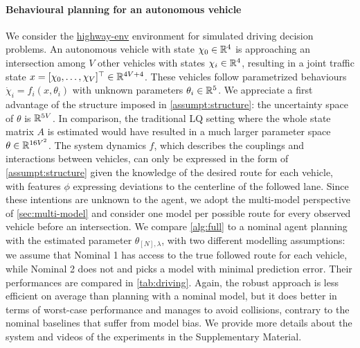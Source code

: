 \paragraph{Behavioural planning for an autonomous vehicle}
We consider the \href{https://github.com/eleurent/highway-env}{highway-env} environment \citep{highway-env} for simulated driving decision problems. An autonomous vehicle with state $\chi_0\in\mathbb{R}^4$ is approaching an intersection among $V$ other vehicles with states $\chi_i\in\mathbb{R}^4$, resulting in a joint traffic state $x = [\chi_0, \dots,\chi_V]^\top\in\mathbb{R}^{4V+4}$. These vehicles follow parametrized behaviours $\dot{\chi}_i=f_i(x,\theta_i)$ with unknown parameters $\theta_i\in\mathbb{R}^5$. We appreciate a first advantage of the structure imposed in \autoref{assumpt:structure}: the uncertainty space of $\theta$ is $\mathbb{R}^{5V}$. In comparison, the traditional LQ setting where the whole state matrix $A$ is estimated would have resulted in a much larger parameter space $\theta\in\mathbb{R}^{16V^2}$.
The system dynamics $f$, which describes the couplings and interactions between vehicles, can only be expressed in the form of \autoref{assumpt:structure} given the knowledge of the desired route for each vehicle, with features $\phi$ expressing deviations to the centerline of the followed lane. Since these intentions are unknown to the agent, we adopt the multi-model perspective of \autoref{sec:multi-model} and consider one model per possible route for every observed vehicle before an intersection. We compare \autoref{alg:full} to a nominal agent planning with the estimated parameter $\theta_{[N],\lambda}$, with two different modelling assumptions: we assume that Nominal 1 has access to the true followed route for each vehicle, while Nominal 2 does not and picks a model with minimal prediction error. Their performances are compared in \autoref{tab:driving}. Again, the robust approach is less efficient on average than planning with a nominal model, but it does better in terms of worst-case performance and manages to avoid collisions, contrary to the nominal baselines that suffer from model bias. We provide more details about the system and videos of the experiments in the Supplementary Material.

